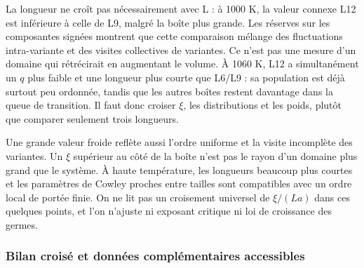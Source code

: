 La longueur ne croît pas nécessairement avec L : à 1000 K, la valeur connexe L12 est inférieure à celle de L9, malgré la boîte plus grande. Les réserves sur les composantes signées montrent que cette comparaison mélange des fluctuations intra-variante et des visites collectives de variantes. Ce n’est pas une mesure d’un domaine qui rétrécirait en augmentant le volume. À 1060 K, L12 a simultanément un $q$ plus faible et une longueur plus courte que L6/L9 : sa population est déjà surtout peu ordonnée, tandis que les autres boîtes restent davantage dans la queue de transition. Il faut donc croiser $\xi$, les distributions et les poids, plutôt que comparer seulement trois longueurs.

Une grande valeur froide reflète aussi l’ordre uniforme et la visite incomplète des variantes. Un $\xi$ supérieur au côté de la boîte n’est pas le rayon d’un domaine plus grand que le système. À haute température, les longueurs beaucoup plus courtes et les paramètres de Cowley proches entre tailles sont compatibles avec un ordre local de portée finie. On ne lit pas un croisement universel de $\xi/(La)$ dans ces quelques points, et l’on n’ajuste ni exposant critique ni loi de croissance des germes.

\subsubsection{Bilan croisé et données complémentaires accessibles}

